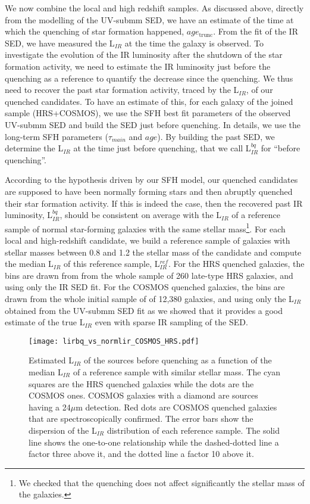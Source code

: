 \documentclass[traditabstract]{aa} %
\begin{document}
We now combine the local and high redshift samples.
As discussed above, directly from the modelling of the UV-submm SED, we have an estimate of the time at which the quenching of star formation happened, $age_{\mathrm{trunc}}$.
From the fit of the IR SED, we have measured the L$_{IR}$ at the time the galaxy is observed.
To investigate the evolution of the IR luminosity after the shutdown of the star formation activity, we need to estimate the IR luminosity just before the quenching as a reference to quantify the decrease since the quenching.
We thus need to recover the past star formation activity, traced by the L$_{IR}$, of our quenched candidates.
To have an estimate of this, for each galaxy of the joined sample (HRS+COSMOS), we use the SFH best fit parameters of the observed UV-submm SED and build the SED just before quenching.
In details, we use the long-term SFH parameters ($\tau_{main}$ and $age$). 
By building the past SED, we determine the L$_{IR}$ at the time just before quenching, that we call L$_{IR}^{bq}$ for ``before quenching''.

According to the hypothesis driven by our SFH model, our quenched candidates are supposed to have been normally forming stars and then abruptly quenched their star formation activity.
If this is indeed the case, then the recovered past IR luminosity, L$_{IR}^{bq}$, should be consistent on average with the L$_{IR}$ of a reference sample of normal star-forming galaxies with the same stellar mass\footnote{We checked that the quenching does not affect significantly the stellar mass of the galaxies.}.
For each local and high-redshift candidate, we build a reference sample of galaxies with stellar masses between 0.8 and 1.2 the stellar mass of the candidate and compute the median L$_{IR}$ of this reference sample, L$_{IR}^{ref}$.
For the HRS quenched galaxies, the bins are drawn from from the whole sample of 260 late-type HRS galaxies, and using only the IR SED fit.
For the COSMOS quenched galaxies, the bins are drawn from the whole initial sample of \cite{Aufort20} of 12,380 galaxies, and using only the L$_{IR}$ obtained from the UV-submm SED fit as we showed that it provides a good estimate of the true L$_{IR}$ even with sparse IR sampling of the SED.


\begin{figure}[!h] 
  	\texttt{[image: lirbq\_vs\_normlir\_COSMOS\_HRS.pdf]}
  	\caption{\label{lbq_lref} Estimated L$_{IR}$ of the sources before quenching as a function of the median L$_{IR}$ of a reference sample with similar stellar mass. The cyan squares are the HRS quenched galaxies while the dots are the COSMOS ones. COSMOS galaxies with a diamond are sources having a 24$\mu$m detection. Red dots are COSMOS quenched galaxies that are spectroscopically confirmed. The error bars show the dispersion of the L$_{IR}$ distribution of each reference sample. The solid line shows the one-to-one relationship while the dashed-dotted line a factor three above it, and the dotted line a factor 10 above it.}
\end{figure}
\end{document}
